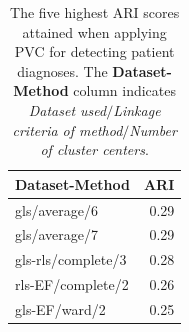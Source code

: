 \begin{table}
    \centering
    \begin{tabular}{lr}
        \toprule
        Dataset-Method     &  ARI \\
        \midrule
        gls/average/6      & 0.29 \\
        gls/average/7      & 0.29 \\
        gls-rls/complete/3 & 0.28 \\
        rls-EF/complete/2  & 0.26 \\
        gls-EF/ward/2      & 0.25 \\
        \bottomrule
    \end{tabular}
    \caption{The five highest ARI scores attained when applying PVC for detecting patient diagnoses.
             The \textbf{Dataset-Method} column indicates \textit{Dataset used}$/$\textit{Linkage criteria of method}$/$\textit{Number of cluster centers}.}
    \label{tab:pvc_ind_ari}
\end{table}


